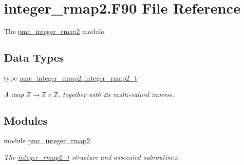 \hypertarget{integer__rmap2_8_f90}{}\section{integer\+\_\+rmap2.\+F90 File Reference}
\label{integer__rmap2_8_f90}


The \mbox{\hyperlink{namespacepmc__integer__rmap2}{pmc\+\_\+integer\+\_\+rmap2}} module.  


\subsection*{Data Types}
\begin{DoxyCompactItemize}
\item 
type \mbox{\hyperlink{structpmc__integer__rmap2_1_1integer__rmap2__t}{pmc\+\_\+integer\+\_\+rmap2\+::integer\+\_\+rmap2\+\_\+t}}
\begin{DoxyCompactList}\small\item\em A map $\mathbb{Z} \to \mathbb{Z} \times \mathbb{Z}$, together with its multi-\/valued inverse. \end{DoxyCompactList}\end{DoxyCompactItemize}
\subsection*{Modules}
\begin{DoxyCompactItemize}
\item 
module \mbox{\hyperlink{namespacepmc__integer__rmap2}{pmc\+\_\+integer\+\_\+rmap2}}
\begin{DoxyCompactList}\small\item\em The \mbox{\hyperlink{structpmc__integer__rmap2_1_1integer__rmap2__t}{integer\+\_\+rmap2\+\_\+t}} structure and assocated subroutines. \end{DoxyCompactList}\end{DoxyCompactItemize}
